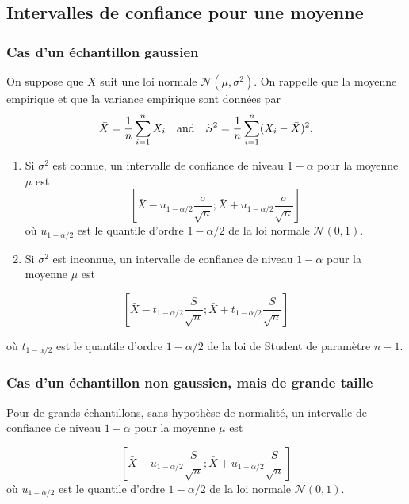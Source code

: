 \documentclass[]{book}
\theoremstyle{definition}
\theoremstyle{definition}
\theoremstyle{remark}
\begin{document}
\subsection{Intervalles de confiance pour une
moyenne}\label{intervalles-de-confiance-pour-une-moyenne}

\subsubsection{Cas d'un échantillon
gaussien}\label{cas-dun-echantillon-gaussien}

On suppose que \(X\) suit une loi normale \(\mathcal N(\mu,\sigma^2)\).
On rappelle que la moyenne empirique et que la variance empirique sont
données par
\[\bar X=\frac{1}{n}\displaystyle\sum_{i=1}^nX_i\quad{\rm and}\quad S^2=\frac{1}{n}\displaystyle\sum_{i=1}^n(X_i-\bar X)^2.\]

\begin{enumerate}
\def\labelenumi{\arabic{enumi}.}
\item
  Si \(\sigma^2\) est connue, un intervalle de confiance de niveau
  \(1-\alpha\) pour la moyenne \(\mu\) est
  \[\left[ \bar X - u_{1-\alpha/2} \frac{\sigma}{\sqrt{n}};\bar X + u_{1-\alpha/2} \frac{\sigma}{\sqrt{n}} \right]\]
  où \(u_{1-\alpha/2}\) est le quantile d'ordre \(1-\alpha/2\) de la loi
  normale \(\mathcal N(0,1)\).
\item
  Si \(\sigma^2\) est inconnue, un intervalle de confiance de niveau
  \(1-\alpha\) pour la moyenne \(\mu\) est
\end{enumerate}

\[
\left[\bar X - t_{1-\alpha/2} \frac{S}{\sqrt{n}};\bar X + t_{1-\alpha/2} \frac{S}{\sqrt{n}} \right]
\]

où \(t_{1-\alpha/2}\) est le quantile d'ordre \(1-\alpha/2\) de la loi
de Student de paramètre \(n-1\).

\subsubsection{Cas d'un échantillon non gaussien, mais de grande
taille}\label{cas-dun-echantillon-non-gaussien-mais-de-grande-taille}

Pour de grands échantillons, sans hypothèse de normalité, un intervalle
de confiance de niveau \(1-\alpha\) pour la moyenne \(\mu\) est

\[
\left[\bar X - u_{1-\alpha/2} \frac{S}{\sqrt{n}};\bar X + u_{1-\alpha/2} \frac{S}{\sqrt{n}} \right]
\] où \(u_{1-\alpha/2}\) est le quantile d'ordre \(1-\alpha/2\) de la
loi normale \(\mathcal N(0,1)\).
\end{document}
